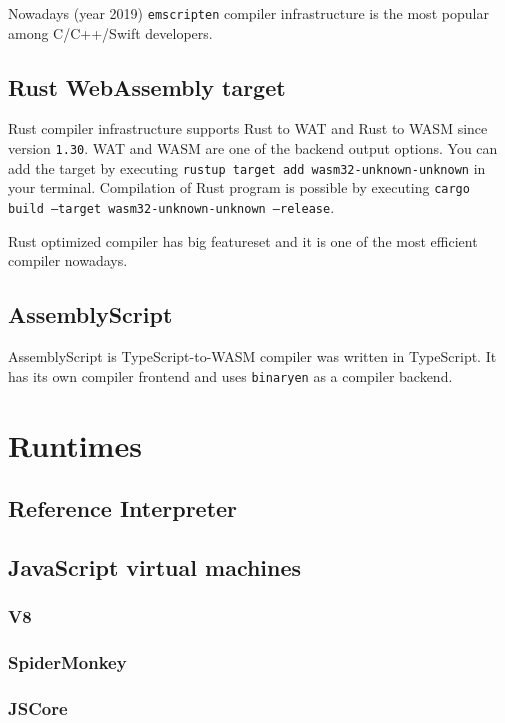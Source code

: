 Nowadays (year 2019) \texttt{emscripten} compiler infrastructure is the most popular among C/C++/Swift developers.

\subsection{Rust WebAssembly target}

Rust compiler infrastructure supports Rust to WAT and Rust to WASM since version \texttt{1.30}.
WAT and WASM are one of the backend output options.
You can add the target by executing \texttt{rustup target add wasm32-unknown-unknown} in your terminal.
Compilation of Rust program is possible by executing \texttt{cargo build --target wasm32-unknown-unknown --release}.

Rust optimized compiler has big featureset and it is one of the most efficient compiler nowadays.

\subsection{AssemblyScript}

AssemblyScript is TypeScript-to-WASM compiler was written in TypeScript.
It has its own compiler frontend and uses \texttt{binaryen} as a compiler backend. 

\section {Runtimes}

\subsection{Reference Interpreter}

\subsection{JavaScript virtual machines}

\subsubsection{V8}

\subsubsection{SpiderMonkey}

\subsubsection{JSCore}

